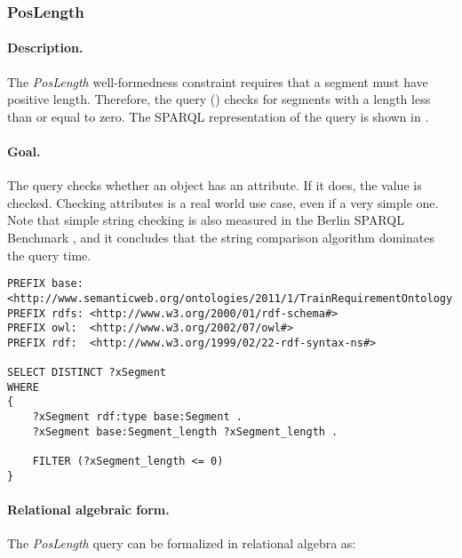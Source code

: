 \subsubsection{PosLength}

\paragraph{Description.} The \textit{PosLength} well-formedness constraint requires that a segment must have positive length. Therefore, the query () checks for segments with a length less than or equal to zero. The SPARQL representation of the query is shown in .

\paragraph{Goal.} The query checks whether an object has an attribute. If it does, the value is checked. Checking attributes is a real world use case, even if a very simple one. Note that simple string checking is also measured in the Berlin SPARQL Benchmark \cite{BSBM}, and it concludes that the string comparison algorithm dominates the query time.


\begin{lstlisting}[caption=The PosLength query in SPARQL, label=lst:poslength-sparql]
PREFIX base: <http://www.semanticweb.org/ontologies/2011/1/TrainRequirementOntology.owl#>
PREFIX rdfs: <http://www.w3.org/2000/01/rdf-schema#>
PREFIX owl:  <http://www.w3.org/2002/07/owl#>
PREFIX rdf:  <http://www.w3.org/1999/02/22-rdf-syntax-ns#>

SELECT DISTINCT ?xSegment
WHERE
{
    ?xSegment rdf:type base:Segment .
    ?xSegment base:Segment_length ?xSegment_length .

    FILTER (?xSegment_length <= 0)
}
\end{lstlisting}


\paragraph{Relational algebraic form.} The \textit{PosLength} query can be formalized in relational algebra as:

